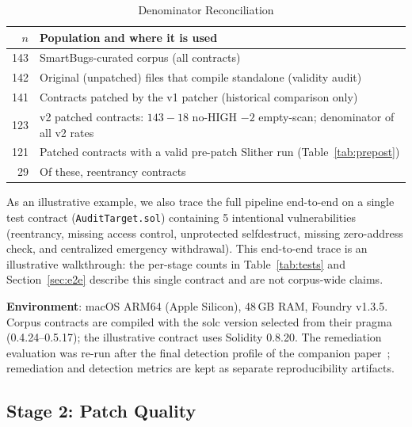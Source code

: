 \documentclass[conference]{IEEEtran}
\begin{document}
\begin{table}[htbp]
\caption{Denominator Reconciliation}
\label{tab:denominators}
\centering
\footnotesize
\setlength{\tabcolsep}{3pt}
\begin{tabular}{@{}rp{}@{}}
\toprule
\textbf{$n$} & \textbf{Population and where it is used} \\
\midrule
143 & SmartBugs-curated corpus (all contracts) \\
142 & Original (unpatched) files that compile standalone (validity audit) \\
141 & Contracts patched by the v1 patcher (historical comparison only) \\
123 & v2 patched contracts: $143 - 18$ no-HIGH $- 2$ empty-scan; denominator of all v2 rates \\
121 & Patched contracts with a valid pre-patch Slither run (Table~\ref{tab:prepost}) \\
29 & Of these, reentrancy contracts \\
\bottomrule
\end{tabular}
\end{table}

As an illustrative example, we also trace the full pipeline end-to-end on a single test contract (\texttt{AuditTarget.sol}) containing 5 intentional vulnerabilities (reentrancy, missing access control, unprotected selfdestruct, missing zero-address check, and centralized emergency withdrawal). This end-to-end trace is an illustrative walkthrough: the per-stage counts in Table~\ref{tab:tests} and Section~\ref{sec:e2e} describe this single contract and are not corpus-wide claims.

\textbf{Environment}: macOS ARM64 (Apple Silicon), 48\,GB RAM, Foundry v1.3.5. Corpus contracts are compiled with the solc version selected from their pragma (0.4.24--0.5.17); the illustrative contract uses Solidity 0.8.20. The remediation evaluation was re-run after the final detection profile of the companion paper~\cite{boiero2025miesc}; remediation and detection metrics are kept as separate reproducibility artifacts.

\subsection{Stage 2: Patch Quality}
\end{document}

